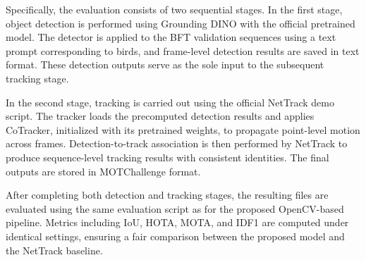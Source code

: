 Specifically, the evaluation consists of two sequential stages. In the first stage, object detection is performed using Grounding DINO with the official pretrained model. The detector is applied to the BFT validation sequences using a text prompt corresponding to birds, and frame-level detection results are saved in text format. These detection outputs serve as the sole input to the subsequent tracking stage.

In the second stage, tracking is carried out using the official NetTrack demo script. The tracker loads the precomputed detection results and applies CoTracker, initialized with its pretrained weights, to propagate point-level motion across frames. Detection-to-track association is then performed by NetTrack to produce sequence-level tracking results with consistent identities. The final outputs are stored in MOTChallenge format.

After completing both detection and tracking stages, the resulting files are evaluated using the same evaluation script as for the proposed OpenCV-based pipeline. Metrics including IoU, HOTA, MOTA, and IDF1 are computed under identical settings, ensuring a fair comparison between the proposed model and the NetTrack baseline.